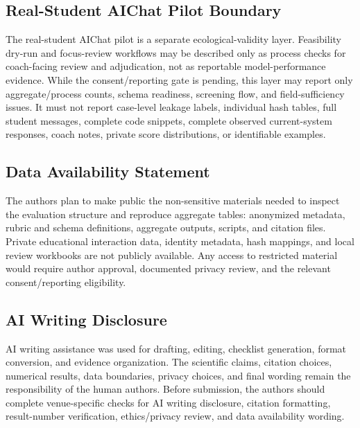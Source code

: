 \documentclass[11pt]{article}
\begin{document}
\subsection{Real-Student AIChat Pilot Boundary}

The real-student AIChat pilot is a separate ecological-validity layer. Feasibility dry-run and focus-review workflows may be described only as process checks for coach-facing review and adjudication, not as reportable model-performance evidence. While the consent/reporting gate is pending, this layer may report only aggregate/process counts, schema readiness, screening flow, and field-sufficiency issues. It must not report case-level leakage labels, individual hash tables, full student messages, complete code snippets, complete observed current-system responses, coach notes, private score distributions, or identifiable examples.

\subsection{Data Availability Statement}

The authors plan to make public the non-sensitive materials needed to inspect the evaluation structure and reproduce aggregate tables: anonymized metadata, rubric and schema definitions, aggregate outputs, scripts, and citation files. Private educational interaction data, identity metadata, hash mappings, and local review workbooks are not publicly available. Any access to restricted material would require author approval, documented privacy review, and the relevant consent/reporting eligibility.

\subsection{AI Writing Disclosure}

AI writing assistance was used for drafting, editing, checklist generation, format conversion, and evidence organization. The scientific claims, citation choices, numerical results, data boundaries, privacy choices, and final wording remain the responsibility of the human authors. Before submission, the authors should complete venue-specific checks for AI writing disclosure, citation formatting, result-number verification, ethics/privacy review, and data availability wording.

\appendix
\setcounter{table}{0}
\renewcommand{\thetable}{A\arabic{table}}
\renewcommand{\theHtable}{A\arabic{table}}
\end{document}

